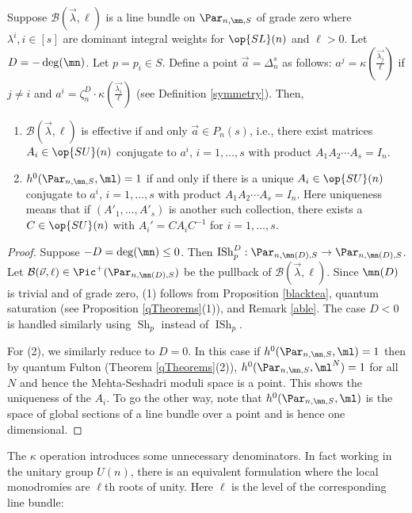 \begin{proposition}
\notready\label{kappa}
Suppose $\mathcal{B}(\vec{\lambda},\ell)$ is a line bundle on  $\Par_{n,\mn,S}$ of grade zero where $\lambda^i, i\in[s]$ are dominant integral weights for $\op{SL}(n)$ and $\ell> 0$. Let $D=-\deg(\mn)$. Let $p=p_i\in S$. Define a point $\vec{a}= \Delta_n^s$ as follows: $a^j=\kappa(\frac{\vec{\lambda_j}}{\ell})$  if $j\neq i$ and $a^i=\zeta^D_n\cdot \kappa(\frac{\vec{\lambda_i}}{\ell})$ (see Definition  \ref{symmetry}). Then,
\begin{enumerate}
\item  $\mathcal{B}(\vec{\lambda},\ell)$ is effective if and only $\vec{a}\in P_n(s)$, i.e., there exist matrices $A_i\in \op{SU}(n)$ conjugate to $a^i$, $i=1,\dots,s$ with product $A_1 A_2\cdots A_s=I_n$.
\item  $h^0(\Par_{n,\mn,S},\ml)=1$ if and only if there is a unique $A_i\in \op{SU}(n)$ conjugate to $a^i$, $i=1,\dots,s$  with product $A_1A_2\cdots A_s=I_n$. Here uniqueness means that if $(A'_1,\dots,A'_s)$ is another such collection, there exists a $C\in \op{SU}(n)$ with $A_i'=CA_iC^{-1}$ for $i=1,\dots,s$.
\end{enumerate}
\end{proposition}
\begin{proof}
Suppose $-D=\deg(\mn)\leq 0$. Then $\operatorname{ISh}_p^D: \Par_{n,\mn(D),S}\to \Par_{n,\mn(D),S}$. Let  $\mathcal{B}(\vec{\nu},\ell)\in \Pic^+(\Par_{n,\mn(D),S})$ be the pullback of $\mathcal{B}(\vec{\lambda},\ell)$.  Since $\mn(D)$ is trivial and of grade zero, (1) follows from Proposition \ref{blacktea}, quantum saturation \cite{BHorn}(see Proposition \ref{qTheorems}(1)), and Remark \ref{able}. The case $D<0$ is handled similarly using  $\operatorname{Sh}_p$ instead of  $\operatorname{ISh}_p$.

For (2), we similarly reduce to $D=0$. In this case if $h^0(\Par_{n,\mn,S},\ml)=1$ then by quantum Fulton (Theorem \ref{qTheorems}(2)), $h^0(\Par_{n,\mn,S},\ml^N)=1$ for all $N$ and hence the Mehta-Seshadri moduli space is a point. This shows the uniqueness of the $A_i$. To go the other way, note that  $h^0(\Par_{n,\mn,S},\ml)$ is the space of global sections of  a line bundle over a point and is hence one dimensional.
\end{proof}

The $\kappa$ operation introduces some unnecessary denominators. In fact working in the unitary group $U(n)$, there is an equivalent formulation where the local monodromies are $\ell$th roots of unity. Here $\ell$ is the level of the corresponding line bundle:

